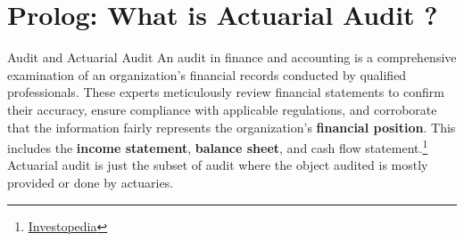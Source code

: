 \documentclass[aspectratio=169]{beamer}
\begin{document}
\section{Prolog: What is Actuarial Audit ?}
\begin{frame}{Audit and Actuarial Audit}
An audit in finance and accounting is a comprehensive examination of an organization's financial records conducted by qualified professionals. These experts meticulously review financial statements to confirm their accuracy, ensure compliance with applicable regulations, and corroborate that the information fairly represents the organization's \textbf{financial position}. This includes the \textbf{income statement}, \textbf{balance sheet}, and cash flow statement.\footnote{\href{https://www.investopedia.com/terms/a/audit.asp}{Investopedia}} \\
Actuarial audit is just the subset of audit where the object audited is mostly provided or done by actuaries.\\
\end{frame}



\end{document}
